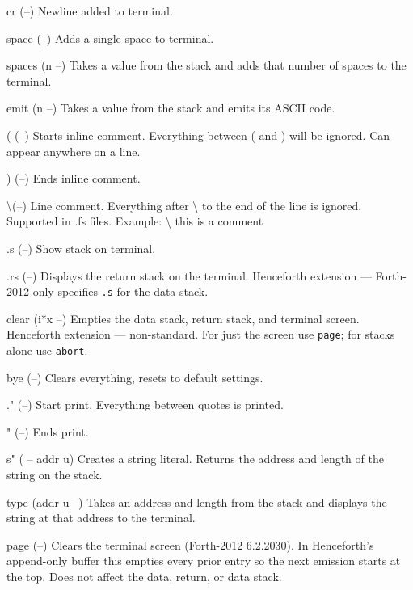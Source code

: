 \documentclass[a4paper, 11pt, openany]{book}
\begin{document}
\begin{forthbox}
  cr           (--)
               Newline added to terminal.

  space        (--)
               Adds a single space to terminal.

  spaces       (n --)
               Takes a value from the stack and adds that number
               of spaces to the terminal.

  emit         (n --)
               Takes a value from the stack and emits its ASCII
               code.

  (            (--)
               Starts inline comment. Everything between ( and )
               will be ignored. Can appear anywhere on a line.

  )            (--)
               Ends inline comment.

  \textbackslash            (--)
               Line comment. Everything after \textbackslash{} to
               the end of the line is ignored. Supported in .fs
               files. Example: \textbackslash{} this is a comment

  .s           (--)
               Show stack on terminal.

  .rs          (--)
               Displays the return stack on the terminal. Henceforth
               extension --- Forth-2012 only specifies \texttt{.s}
               for the data stack.

  clear        (i*x --)
               Empties the data stack, return stack, and terminal
               screen. Henceforth extension --- non-standard. For just
               the screen use \texttt{page}; for stacks alone use
               \texttt{abort}.

  bye          (--)
               Clears everything, resets to default settings.

  ."           (--)
               Start print. Everything between quotes is printed.

  "            (--)
               Ends print.

  s"           ( -- addr u)
               Creates a string literal. Returns the address and
               length of the string on the stack.

  type         (addr u --)
               Takes an address and length from the stack and
               displays the string at that address to the terminal.

  page         (--)
               Clears the terminal screen (Forth-2012 6.2.2030). In
               Henceforth's append-only buffer this empties every
               prior entry so the next emission starts at the top.
               Does not affect the data, return, or data stack.


\end{forthbox}
\end{document}
